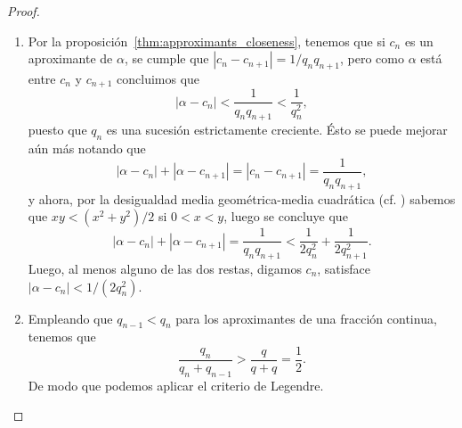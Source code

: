 \documentclass[teoria-numeros.tex]{subfiles}
\begin{document}
\begin{proof}
	\begin{enumerate}
		\item Por la proposición~\ref{thm:approximants_closeness}, tenemos que si $c_n$ es un aproximante de $\alpha$, se cumple que
			$|c_n - c_{n+1}| = 1/q_nq_{n+1}$, pero como $\alpha$ está entre $c_n$ y $c_{n+1}$ concluimos que
			$$ |\alpha - c_n| < \frac{1}{q_nq_{n+1}} < \frac{1}{q_n^2}, $$
			puesto que $q_n$ es una sucesión estrictamente creciente.
			Ésto se puede mejorar aún más notando que
			$$ |\alpha - c_n| + |\alpha - c_{n+1}| = |c_n - c_{n+1}| = \frac{1}{q_n q_{n+1}}, $$
			y ahora, por la desigualdad media geométrica-media cuadrática (cf. \cite[Teo.~6.68]{Top}) sabemos que $xy < (x^2 + y^2)/2$ si $0 < x < y$,
			luego se concluye que
			$$ |\alpha - c_n| + |\alpha - c_{n+1}| = \frac{1}{q_n q_{n+1}} < \frac{1}{2q_n^2} + \frac{1}{2q_{n+1}^2}. $$
			Luego, al menos alguno de las dos restas, digamos $c_n$, satisface $|\alpha - c_n| < 1/(2q_n^2)$.
		\item Empleando que $q_{n-1} < q_n$ para los aproximantes de una fracción continua, tenemos que
			$$ \frac{q_n}{q_n + q_{n-1}} > \frac{q}{q + q} = \frac{1}{2}. $$
			De modo que podemos aplicar el criterio de Legendre. \qedhere

\end{enumerate}
\end{proof}
\end{document}
